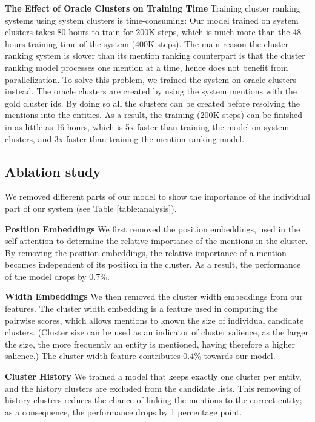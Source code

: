 \documentclass[10pt, a4paper]{article}
\begin{document}
\textbf{The Effect of Oracle Clusters on Training Time} 
Training  cluster ranking systems using system clusters is time-consuming:
Our model trained on  system clusters takes 80 hours to train for 200K steps, which is much more than 
the 48 hours training time of the 
 system (400K steps). 
The main reason the cluster ranking system 
is slower than
its mention ranking counterpart is that the cluster ranking model processes one mention at a time, hence does not benefit from parallelization. 
To solve this problem, we trained the system on  oracle clusters instead.
The oracle clusters are created by using the system mentions with the gold cluster ids.
By doing so all the clusters can be created before resolving the mentions into the entities. 
As a result, the training (200K steps) can be finished in as little as 16 hours, which is 5x faster than training the model on system clusters, and 3x faster than training the mention ranking model.

\subsection{Ablation study}
We removed different parts of our model to show the importance of the individual part of our system (see Table \ref{table:analysis}).

\textbf{Position Embeddings} We first removed the position embeddings,  used in the self-attention to determine the relative importance of the mentions in the cluster. 
By removing the position embeddings, the relative importance of a mention becomes independent of its position in the cluster. As a result, the performance of the model drops by 0.7\%.

\textbf{Width Embeddings} We then removed the cluster width embeddings from our features. The cluster width embedding is a feature used in computing the pairwise scores, which allows mentions to known the size of individual candidate clusters. (Cluster size can be used as an indicator of  cluster salience, as the larger the size, the more frequently an entity is mentioned, having therefore a higher salience.)
The cluster width feature contributes 0.4\% towards our model.

\textbf{Cluster History} We trained a model that keeps exactly one cluster per entity, and
the history clusters are excluded from the candidate lists. 
This removing of history clusters reduces the chance of linking the mentions to the correct entity; as a consequence, the performance drops by 1 percentage point. 
\end{document}
